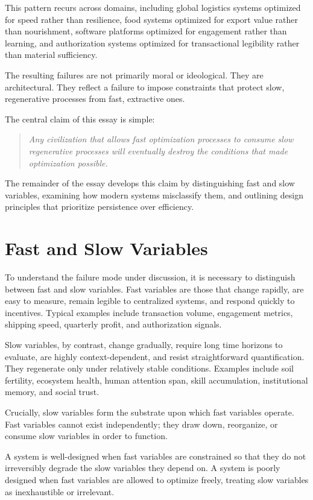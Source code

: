 \documentclass[12pt]{article} \usepackage[margin=1in]{geometry} \usepackage{setspace} \usepackage{amsmath,amssymb} \usepackage{hyperref}
\begin{document}
This pattern recurs across domains, including global logistics systems optimized for speed rather than resilience, food systems optimized for export value rather than nourishment, software platforms optimized for engagement rather than learning, and authorization systems optimized for transactional legibility rather than material sufficiency.

The resulting failures are not primarily moral or ideological. They are architectural. They reflect a failure to impose constraints that protect slow, regenerative processes from fast, extractive ones.

The central claim of this essay is simple:

\begin{quote} \textit{Any civilization that allows fast optimization processes to consume slow regenerative processes will eventually destroy the conditions that made optimization possible.} \end{quote}

The remainder of the essay develops this claim by distinguishing fast and slow variables, examining how modern systems misclassify them, and outlining design principles that prioritize persistence over efficiency.

\section{Fast and Slow Variables}

To understand the failure mode under discussion, it is necessary to distinguish between fast and slow variables. Fast variables are those that change rapidly, are easy to measure, remain legible to centralized systems, and respond quickly to incentives. Typical examples include transaction volume, engagement metrics, shipping speed, quarterly profit, and authorization signals.

Slow variables, by contrast, change gradually, require long time horizons to evaluate, are highly context-dependent, and resist straightforward quantification. They regenerate only under relatively stable conditions. Examples include soil fertility, ecosystem health, human attention span, skill accumulation, institutional memory, and social trust.

Crucially, slow variables form the substrate upon which fast variables operate. Fast variables cannot exist independently; they draw down, reorganize, or consume slow variables in order to function.

A system is well-designed when fast variables are constrained so that they do not irreversibly degrade the slow variables they depend on. A system is poorly designed when fast variables are allowed to optimize freely, treating slow variables as inexhaustible or irrelevant.
\end{document}
